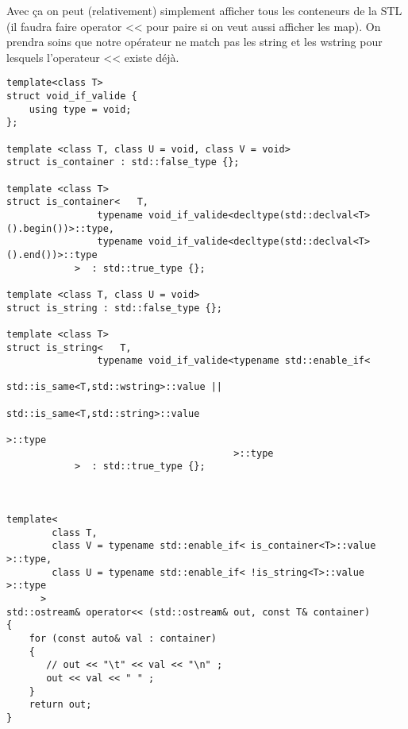 \documentclass[a4paper, 11pt]{article}
\begin{document}
Avec ça on peut (relativement) simplement afficher tous les conteneurs de la STL (il faudra faire operator << pour paire si on veut aussi afficher les map). On prendra soins que notre opérateur ne match pas les string et les wstring pour lesquels l'operateur << existe déjà.
\begin{lstlisting}
template<class T>
struct void_if_valide {
    using type = void;
};

template <class T, class U = void, class V = void>
struct is_container : std::false_type {};

template <class T>
struct is_container<   T,
                typename void_if_valide<decltype(std::declval<T>().begin())>::type,
                typename void_if_valide<decltype(std::declval<T>().end())>::type
            >  : std::true_type {};

template <class T, class U = void>
struct is_string : std::false_type {};

template <class T>
struct is_string<   T,
                typename void_if_valide<typename std::enable_if<
                                                                std::is_same<T,std::wstring>::value ||
                                                                std::is_same<T,std::string>::value
                                                                >::type
                                        >::type
            >  : std::true_type {};



template<
        class T,
        class V = typename std::enable_if< is_container<T>::value >::type,
        class U = typename std::enable_if< !is_string<T>::value >::type
      >
std::ostream& operator<< (std::ostream& out, const T& container)
{
    for (const auto& val : container)
    {
       // out << "\t" << val << "\n" ;
       out << val << " " ;
    }
    return out;
}
\end{lstlisting}
\end{document}
